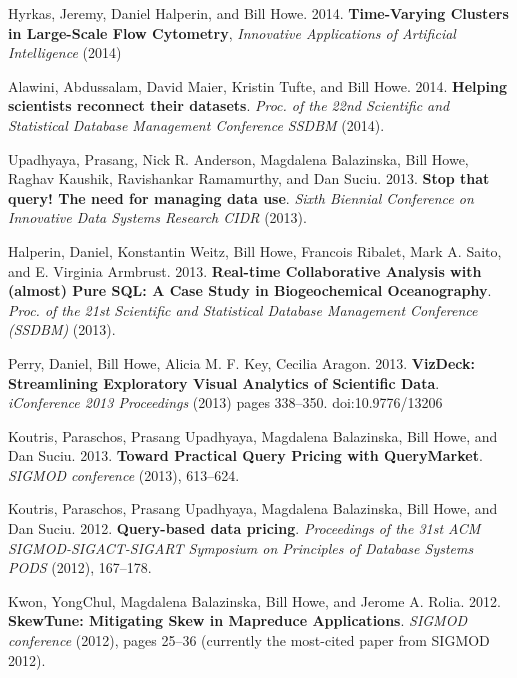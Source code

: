 \begin{bulletlist}
\item Hyrkas, Jeremy, Daniel Halperin, and Bill Howe. 2014. 
\textbf{Time-Varying Clusters in Large-Scale Flow Cytometry}, \emph{Innovative Applications of Artificial Intelligence} (2014)

\item Alawini, Abdussalam, David Maier, Kristin Tufte, and Bill Howe. 2014. 
\textbf{Helping scientists reconnect their datasets}. \emph{Proc. of the 22nd 
Scientific and Statistical Database Management Conference SSDBM} (2014).

\item Upadhyaya, Prasang, Nick R. Anderson, Magdalena Balazinska, Bill
Howe, Raghav Kaushik, Ravishankar Ramamurthy, and Dan Suciu. 2013. \textbf{Stop
that query! The need for managing data use}. \emph{Sixth Biennial Conference 
on Innovative Data Systems Research {CIDR}} (2013).

\item Halperin, Daniel, Konstantin Weitz, Bill Howe, Francois Ribalet, Mark A. Saito,
and E. Virginia Armbrust. 2013. \textbf{Real-time Collaborative Analysis with
(almost) Pure SQL: A Case Study in Biogeochemical Oceanography}.
\emph{Proc. of the 21st Scientific and Statistical
Database Management Conference (SSDBM)} (2013). 

\item Perry, Daniel, Bill Howe, Alicia M. F. Key, Cecilia Aragon. 2013. 
\textbf{VizDeck: Streamlining Exploratory Visual Analytics of Scientific Data}.
\emph{iConference 2013 Proceedings} (2013) pages 338--350. doi:10.9776/13206 

\item Koutris, Paraschos, Prasang Upadhyaya, Magdalena
Balazinska, Bill Howe, and Dan Suciu. 2013. \textbf{Toward Practical Query
Pricing with QueryMarket}. \emph{SIGMOD conference} (2013), 613--624.

\item Koutris, Paraschos, Prasang Upadhyaya, Magdalena Balazinska, Bill
Howe, and Dan Suciu. 2012. \textbf{Query-based data pricing}. \emph{Proceedings of the 31st ACM SIGMOD-SIGACT-SIGART Symposium on Principles of Database Systems {PODS}} (2012),
167--178. 

\item Kwon, YongChul, Magdalena
Balazinska, Bill Howe, and Jerome A. Rolia. 2012. \textbf{SkewTune: Mitigating
Skew in Mapreduce Applications}. \emph{SIGMOD conference} (2012), pages 25--36 (currently the most-cited paper from SIGMOD 2012).


\end{bulletlist}
